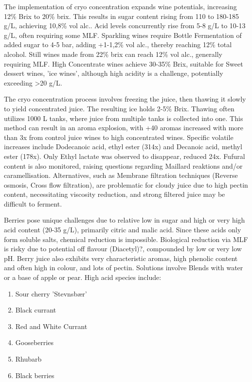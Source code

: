 \vspace{0.5em}
The implementation of cryo concentration expands wine potentials, increasing 12\% Brix to 20\% brix. This results in sugar content rising from 110 to 180-185 g/L, achieving 10,8\% vol alc.. Acid levels concurrently rise from 5-8 g/L to 10-13 g/L, often requiring some MLF. Sparkling wines require Bottle Fermentation of added sugar to 4-5 bar, adding +1-1,2\% vol alc., thereby reaching 12\% total alcohol. Still wines made from 22\% brix can reach 12\% vol alc., generally requiring MLF. High Concentrate wines achieve 30-35\% Brix, suitable for Sweet dessert wines, 'ice wines', although high acidity is a challenge, potentially exceeding >20 g/L.

\vspace{0.5em}
The cryo concentration process involves freezing the juice, then thawing it slowly to yield concentrated juice. The resulting ice holds 2-5\% Brix. Thawing often utilizes 1000 L tanks, where juice from multiple tanks is collected into one. This method can result in an aroma explosion, with +40 aromas increased with more than 3x from control juice wines to high concentrated wines. Specific volatile increases include Dodecanoic acid, ethyl ester (314x) and Decanoic acid, methyl ester (178x). Only Ethyl lactate was observed to disappear, reduced 24x. Fufural content is also monitored, raising questions regarding Maillard reaktions and/or caramellisation. Alternatives, such as Membrane filtration techniques (Reverse osmosis, Cross flow filtration), are problematic for cloudy juice due to high pectin content, necessitating viscosity reduction, and strong filtered juice may be difficult to ferment.

\vspace{0.5em}
Berries pose unique challenges due to relative low in sugar and high or very high acid content (20-35 g/L), primarily citric and malic acid. Since these acids only form soluble salts, chemical reduction is impossible. Biological reduction via MLF is risky due to potential off flavour (Diacetyl)?, compounded by low or very low pH. Berry juice also exhibits very characteristic aromas, high phenolic content and often high in colour, and lots of pectin. Solutions involve Blends with water or a base of apple or pear. High acid species include: 
\begin{enumerate} 
    \item Sour cherry 'Stevnsbær' 
    \item Black currant 
    \item Red and White Currant 
    \item Gooseberries 
    \item Rhubarb 
    \item Black berries 
\end{enumerate} 

